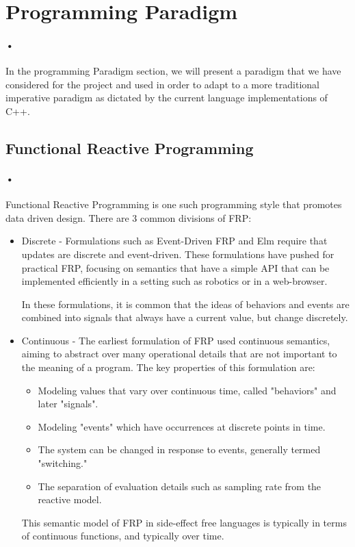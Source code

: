 \documentclass[11pt]{article}
\begin{document}
\section{Programming Paradigm}
\paragraph{•}
In the programming Paradigm section, we will present a paradigm that we have considered for the project and used in order to adapt to a more traditional imperative paradigm as dictated by the current language implementations of C++. 
\subsection{Functional Reactive Programming}
\paragraph{•}
Functional Reactive Programming is one such programming style that promotes data driven design. There are 3 common divisions of FRP:
\begin{itemize}
\item Discrete - Formulations such as Event-Driven FRP and Elm require that updates are discrete and event-driven. These formulations have pushed for practical FRP, focusing on semantics that have a simple API that can be implemented efficiently in a setting such as robotics or in a web-browser.

In these formulations, it is common that the ideas of behaviors and events are combined into signals that always have a current value, but change discretely.

\item Continuous - The earliest formulation of FRP used continuous semantics, aiming to abstract over many operational details that are not important to the meaning of a program. The key properties of this formulation are:
\begin{itemize}
\item Modeling values that vary over continuous time, called "behaviors" and later "signals".
\item Modeling "events" which have occurrences at discrete points in time.
\item The system can be changed in response to events, generally termed "switching."
\item The separation of evaluation details such as sampling rate from the reactive model.
\end{itemize}

This semantic model of FRP in side-effect free languages is typically in terms of continuous functions, and typically over time.
\end{itemize}
\end{document}
